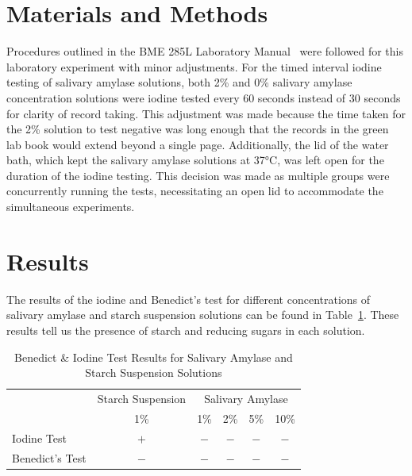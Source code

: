 \documentclass[12pt]{article}
\begin{document}
    \section*{Materials and Methods}
        Procedures outlined in the BME 285L Laboratory Manual~\parencite{LM2023} were followed for this laboratory experiment with minor adjustments.
        For the timed interval iodine testing of salivary amylase solutions, both 2\% and 0\% salivary amylase concentration solutions were iodine tested every 60 seconds instead of 30 seconds for clarity of record taking. This adjustment was made because the time taken for the 2\% solution to test negative was long enough that the records in the green lab book would extend beyond a single page.
        Additionally, the lid of the water bath, which kept the salivary amylase solutions at 37°C, was left open for the duration of the iodine testing. This decision was made as multiple groups were concurrently running the tests, necessitating an open lid to accommodate the simultaneous experiments.

    \section*{Results}
        The results of the iodine and Benedict's test for different concentrations of salivary amylase and starch suspension solutions can be found in Table~\ref{sa_ib}. 
        These results tell us the presence of starch and reducing sugars in each solution.
        \begin{table}[H]
            \caption{Benedict \& Iodine Test Results for Salivary Amylase and Starch Suspension Solutions}
            \centering
            \begin{tabular}{@{}lclcccc@{}}
                \toprule
                & \multicolumn{2}{c}{Starch Suspension} & \multicolumn{4}{c}{Salivary Amylase} \\ 
                \cmidrule(lr){2-3} \cmidrule(lr){4-7} 
                & \multicolumn{2}{c}{1\%} & 1\% & 2\% & 5\% & 10\% \\ 
                \midrule
                Iodine Test & \multicolumn{2}{c}{\(+\)} & \(-\) & \(-\) & \(-\) & \(-\) \\
                Benedict's Test & \multicolumn{2}{c}{\(-\)} & \(-\) & \(-\) & \(-\) & \(-\) \\ \bottomrule
            \end{tabular}\label{sa_ib}
        \end{table}
\end{document}
